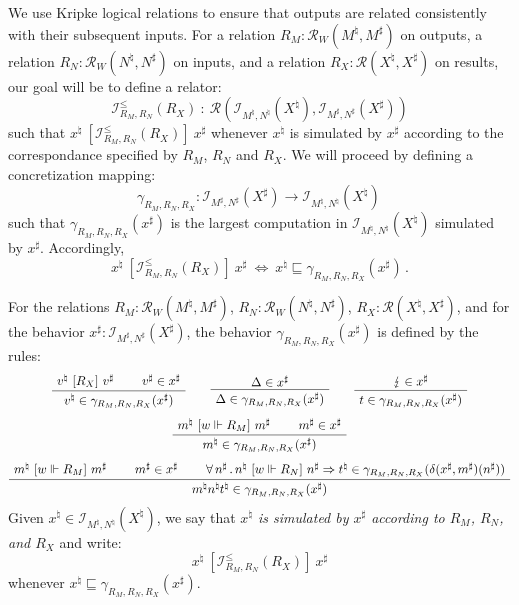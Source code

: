 \documentclass[acmsmall,timestamp,review,anonymous]{acmart}
\newcommand{\ifr}[1]{\ [{#1}]\ }
\begin{document}
We use Kripke logical relations to ensure that
outputs are related consistently with their subsequent inputs.
For
a relation $R_M : \mathcal{R}_W(M^\natural, M^\sharp)$ on outputs,
a relation $R_N : \mathcal{R}_W(N^\natural, N^\sharp)$ on inputs,
and a relation $R_X : \mathcal{R}(X^\natural, X^\sharp)$ on results,
our goal will be to define a relator:
\[ \mathcal{I}^\le_{R_M,R_N}(R_X) \: : \:
   \mathcal{R}(\mathcal{I}_{M^\natural,N^\natural}(X^\natural),
               \mathcal{I}_{M^\sharp,N^\sharp}(X^\sharp)) \]
such that $x^\natural \ifr{\mathcal{I}^\le_{R_M,R_N}(R_X)} x^\sharp$
whenever $x^\natural$ is simulated by $x^\sharp$ according to
the correspondance specified by $R_M$, $R_N$ and $R_X$.
We will proceed by defining a concretization mapping:
\[ \gamma_{R_M,R_N,R_X} : \mathcal{I}_{M^\sharp,N^\sharp}(X^\sharp) \rightarrow
                    \mathcal{I}_{M^\natural,N^\natural}(X^\natural) \, \]
such that $\gamma_{R_M, R_N, R_X}(x^\sharp)$ is
the largest computation in $\mathcal{I}_{M^\natural,N^\natural}(X^\natural)$
simulated by $x^\sharp$.
Accordingly,
\[ x^\natural \ifr{\mathcal{I}^\le_{R_M,R_N}(R_X)} x^\sharp
   \: \Leftrightarrow \:
   x^\natural \sqsubseteq \gamma_{R_M,R_N,R_X}(x^\sharp) \,. \]

\begin{definition}
For the relations $R_M : \mathcal{R}_W(M^\natural, M^\sharp)$,
$R_N : \mathcal{R}_W(N^\natural, N^\sharp)$,
$R_X : \mathcal{R}(X^\natural, X^\sharp)$, and
for the behavior $x^\sharp : \mathcal{I}_{M^\sharp, N^\sharp}(X^\sharp)$,
the behavior $\gamma_{R_M,R_N,R_X}(x^\sharp)$ is defined by the rules:
\begin{gather*}
  \AxiomC{$v^\natural \ifr{R_X} v^\sharp$}
  \AxiomC{$v^\sharp \in x^\sharp$}
  \BinaryInfC{$v^\natural \in \gamma_{R_M,R_N,R_X}(x^\sharp)$}
  \DisplayProof
  \qquad
  \AxiomC{$\Delta \in x^\sharp$}
  \UnaryInfC{$\Delta \in \gamma_{R_M,R_N,R_X}(x^\sharp)$}
  \DisplayProof
  \qquad
  \AxiomC{$\lightning \in x^\sharp$}
  \UnaryInfC{$t \in \gamma_{R_M,R_N,R_X}(x^\sharp)$}
  \DisplayProof
  \\[1ex]
  \AxiomC{$m^\natural \ifr{w \Vdash R_M} m^\sharp$}
  \AxiomC{$m^\sharp \in x^\sharp$}
  \BinaryInfC{$m^\natural \in \gamma_{R_M,R_N,R_X}(x^\sharp)$}
  \DisplayProof
  \\[1ex]
  \AxiomC{$m^\natural \ifr{w \Vdash R_M} m^\sharp$}
  \AxiomC{$m^\sharp \in x^\sharp$}
  \AxiomC{$
      \forall \, n^\sharp \,.\,
        n^\natural \ifr{w \Vdash R_N} n^\sharp \Rightarrow
        t^\natural \in \gamma_{R_M,R_N,R_X}(\delta(x^\sharp, m^\sharp)(n^\sharp))$}
  \TrinaryInfC{$m^\natural n^\natural t^\natural \in \gamma_{R_M,R_N,R_X}(x^\sharp)$}
  \DisplayProof
\end{gather*}
Given $x^\natural \in \mathcal{I}_{M^\natural,N^\natural}(X^\natural)$,
we say that
\emph{$x^\natural$ is simulated by $x^\sharp$ according to
$R_M$, $R_N$, and $R_X$} and write:
\[
    x^\natural \ifr{\mathcal{I}^\le_{R_M,R_N}(R_X)} x^\sharp
\]
whenever $x^\natural \sqsubseteq \gamma_{R_M,R_N,R_X}(x^\sharp)$.
\end{definition}
\end{document}
